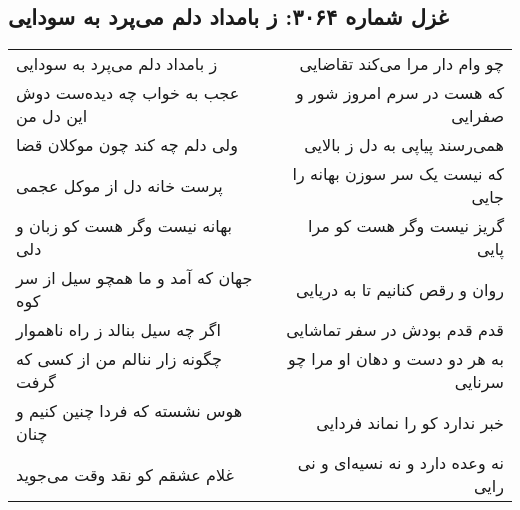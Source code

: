\begin{center}
\section*{غزل شماره ۳۰۶۴: ز بامداد دلم می‌پرد به سودایی}
\label{sec:3064}
\begin{longtable}{l p{0.5cm} r}
ز بامداد دلم می‌پرد به سودایی
&&
چو وام دار مرا می‌کند تقاضایی
\\
عجب به خواب چه دیده‌ست دوش این دل من
&&
که هست در سرم امروز شور و صفرایی
\\
ولی دلم چه کند چون موکلان قضا
&&
همی‌رسند پیاپی به دل ز بالایی
\\
پرست خانه دل از موکل عجمی
&&
که نیست یک سر سوزن بهانه را جایی
\\
بهانه نیست وگر هست کو زبان و دلی
&&
گریز نیست وگر هست کو مرا پایی
\\
جهان که آمد و ما همچو سیل از سر کوه
&&
روان و رقص کنانیم تا به دریایی
\\
اگر چه سیل بنالد ز راه ناهموار
&&
قدم قدم بودش در سفر تماشایی
\\
چگونه زار ننالم من از کسی که گرفت
&&
به هر دو دست و دهان او مرا چو سرنایی
\\
هوس نشسته که فردا چنین کنیم و چنان
&&
خبر ندارد کو را نماند فردایی
\\
غلام عشقم کو نقد وقت می‌جوید
&&
نه وعده دارد و نه نسیه‌ای و نی رایی
\\
\end{longtable}
\end{center}
